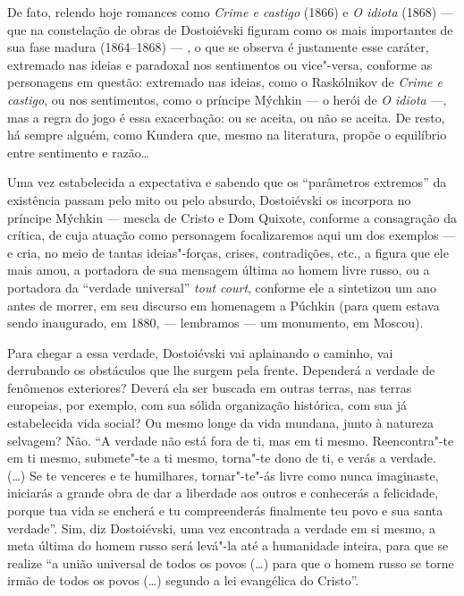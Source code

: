 De fato, relendo hoje romances como \emph{Crime e castigo} (1866)
e \emph{O idiota} (1868) --- que na constelação de obras de Dostoiévski
figuram como os mais importantes de sua fase madura (1864--1868) ---
, o que se observa é justamente esse caráter, extremado nas ideias e
paradoxal nos sentimentos ou vice"-versa, conforme as personagens em
questão: extremado nas ideias, como o Raskólnikov
de \emph{Crime e castigo}, ou nos sentimentos, como o príncipe
Mýchkin --- o herói de \emph{O idiota} ---, mas a regra do jogo é essa
exacerbação: ou se aceita, ou não se aceita. De resto, há sempre alguém,
como Kundera que, mesmo na literatura, propõe o equilíbrio entre
sentimento e razão\ldots{}

Uma vez estabelecida a expectativa e sabendo que os ``parâmetros
extremos'' da existência passam pelo mito ou pelo absurdo, Dostoiévski
os incorpora no príncipe Mýchkin --- mescla de Cristo e Dom Quixote,
conforme a consagração da crítica, de cuja atuação como personagem
focalizaremos aqui um dos exemplos --- e cria, no meio de tantas
ideias"-forças, crises, contradições, etc., a figura que ele mais amou,
a portadora de sua mensagem última ao homem livre russo, ou
a portadora da ``verdade universal'' \emph{tout court}, conforme ele a
sintetizou um ano antes de morrer, em seu discurso em homenagem a
Púchkin (para quem estava sendo inaugurado, em 1880, --- lembramos --- um monumento, em
Moscou).

Para chegar a essa verdade, Dostoiévski vai aplainando o caminho, vai
derrubando os obstáculos que lhe surgem pela frente. Dependerá a verdade
de fenômenos exteriores? Deverá ela ser buscada em outras terras, nas
terras europeias, por exemplo, com sua sólida organização histórica, com
sua já estabelecida vida social? Ou mesmo longe da vida mundana, junto à
natureza selvagem? Não. ``A verdade não está fora de ti, mas em ti
mesmo. Reencontra"-te em ti mesmo, submete"-te a ti mesmo, torna"-te dono
de ti, e verás a verdade. (\ldots{}) Se te venceres e te humilhares,
tornar"-te"-ás livre como nunca imaginaste, iniciarás a grande obra de
dar a liberdade aos outros e conhecerás a felicidade, porque tua vida se
encherá e tu compreenderás finalmente teu povo e sua santa verdade''.
Sim, diz Dostoiévski, uma vez encontrada a verdade em si mesmo, a meta
última do homem russo será levá"-la até a humanidade inteira, para que se
realize ``a união universal de todos os povos (\ldots{}) para que o homem
russo se torne irmão de todos os povos (\ldots{}) segundo a lei evangélica do
Cristo''.


